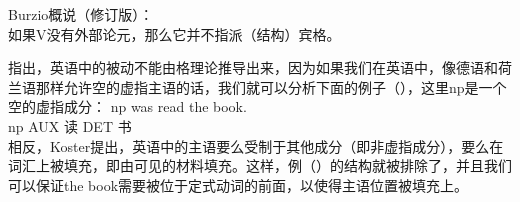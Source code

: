 
\ea
Burzio概说（修订版）：\\
如果V没有外部论元，那么它并不指派（结构）宾格。
\z

\noindent
\citet[]{Koster86a}指出，英语中的被动不能由格理论推导出来，因为如果我们在英语中，像德语和荷兰语那样允许空的虚指主语的话，我们就可以分析下面的例子（），这里np是一个空的虚指成分：
\ea
\gll np was read the book.\\
np AUX 读 DET 书\\
\z
相反，Koster提出，英语中的主语要么受制于其他成分（即非虚指成分），要么在词汇上被填充，即由可见的材料填充。这样，例（）的结构就被排除了，并且我们可以保证the book需要被位于定式动词的前面，以使得主语位置被填充上。

